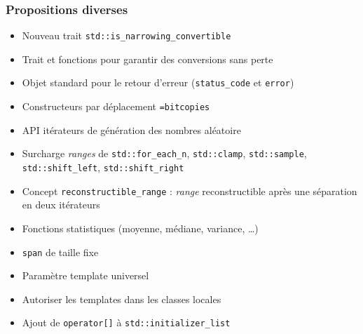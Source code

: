 \documentclass[C++.tex]{subfiles}
\begin{document}
\begin{frame}[fragile]
	\frametitle{Propositions diverses}
	\begin{itemize}

		\item Nouveau trait \lstinline|std::is_narrowing_convertible|
		\item Trait et fonctions pour garantir des conversions sans perte
		\item Objet standard pour le retour d'erreur (\lstinline|status_code| et \lstinline|error|)
		\item Constructeurs par déplacement \lstinline|=bitcopies|
		\item API \og itérateurs\fg{} de génération des nombres aléatoire
		\item Surcharge \og \textit{ranges}\fg{} de \lstinline|std::for_each_n|, \lstinline|std::clamp|, \lstinline|std::sample|, \lstinline|std::shift_left|, \lstinline|std::shift_right|
		\item Concept \lstinline|reconstructible_range| : \textit{range} reconstructible après une séparation en deux itérateurs
		\item Fonctions statistiques (moyenne, médiane, variance, \ldots)
		\item \lstinline|span| de taille fixe
		\item Paramètre template universel


		\item Autoriser les templates dans les classes locales
		\item Ajout de \lstinline|operator[]| à \lstinline|std::initializer_list|
	\end{itemize}
\end{frame}
\end{document}
